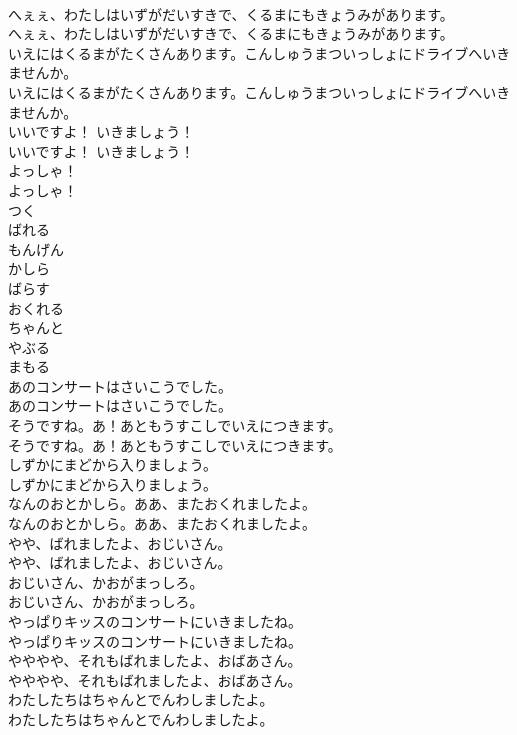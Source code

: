 \documentclass[8pt]{extreport}
\begin{document}
\begin{CJK}{UTF8}{min}
\\	へぇぇ、わたしはいずがだいすきで、くるまにもきょうみがあります。	
\\	へぇぇ、わたしはいずがだいすきで、くるまにもきょうみがあります。 
\\	いえにはくるまがたくさんあります。こんしゅうまついっしょにドライブへいきませんか。	
\\	いえにはくるまがたくさんあります。こんしゅうまついっしょにドライブへいきませんか。 
\\	いいですよ！ いきましょう！	
\\	いいですよ！ いきましょう！ 
\\	よっしゃ！	
\\	よっしゃ！ 
\\	つく
\\	ばれる
\\	もんげん
\\	かしら
\\	ばらす
\\	おくれる
\\	ちゃんと
\\	やぶる
\\	まもる
\\	あのコンサートはさいこうでした。	
\\	あのコンサートはさいこうでした。 
\\	そうですね。あ！あともうすこしでいえにつきます。	
\\	そうですね。あ！あともうすこしでいえにつきます。 
\\	しずかにまどから入りましょう。	
\\	しずかにまどから入りましょう。 
\\	なんのおとかしら。ああ、またおくれましたよ。	
\\	なんのおとかしら。ああ、またおくれましたよ。 
\\	やや、ばれましたよ、おじいさん。	
\\	やや、ばれましたよ、おじいさん。 
\\	おじいさん、かおがまっしろ。	
\\	おじいさん、かおがまっしろ。 
\\	やっぱりキッスのコンサートにいきましたね。	
\\	やっぱりキッスのコンサートにいきましたね。 
\\	やややや、それもばれましたよ、おばあさん。	
\\	やややや、それもばれましたよ、おばあさん。 
\\	わたしたちはちゃんとでんわしましたよ。	
\\	わたしたちはちゃんとでんわしましたよ。 

\end{CJK}
\end{document}
